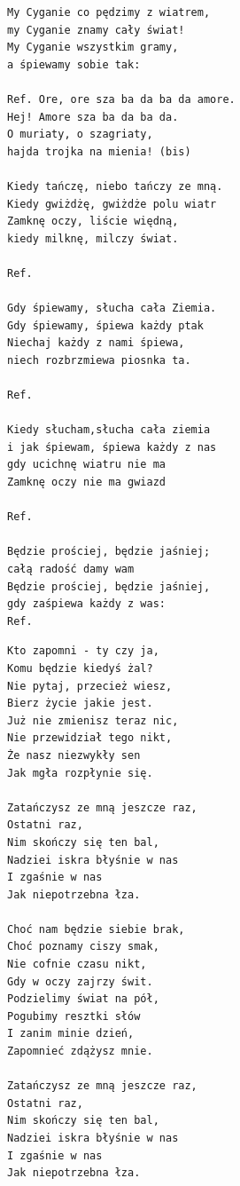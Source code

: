 \documentclass[12pt]{article}
\begin{document}
\begin{verbatim}
My Cyganie co pędzimy z wiatrem,
my Cyganie znamy cały świat!
My Cyganie wszystkim gramy,
a śpiewamy sobie tak:

Ref. Ore, ore sza ba da ba da amore.
Hej! Amore sza ba da ba da.
O muriaty, o szagriaty,
hajda trojka na mienia! (bis)

Kiedy tańczę, niebo tańczy ze mną.
Kiedy gwiżdżę, gwiżdże polu wiatr
Zamknę oczy, liście więdną,
kiedy milknę, milczy świat.

Ref.

Gdy śpiewamy, słucha cała Ziemia.
Gdy śpiewamy, śpiewa każdy ptak
Niechaj każdy z nami śpiewa,
niech rozbrzmiewa piosnka ta.

Ref.

Kiedy słucham,słucha cała ziemia
i jak śpiewam, śpiewa każdy z nas
gdy ucichnę wiatru nie ma
Zamknę oczy nie ma gwiazd

Ref.

Będzie prościej, będzie jaśniej;
całą radość damy wam
Będzie prościej, będzie jaśniej,
gdy zaśpiewa każdy z was:
Ref.
\end{verbatim}
\clearpage

\begin{verbatim}
Kto zapomni - ty czy ja,
Komu będzie kiedyś żal?
Nie pytaj, przecież wiesz,
Bierz życie jakie jest.
Już nie zmienisz teraz nic,
Nie przewidział tego nikt,
Że nasz niezwykły sen
Jak mgła rozpłynie się.

Zatańczysz ze mną jeszcze raz,
Ostatni raz,
Nim skończy się ten bal,
Nadziei iskra błyśnie w nas
I zgaśnie w nas
Jak niepotrzebna łza.

Choć nam będzie siebie brak,
Choć poznamy ciszy smak,
Nie cofnie czasu nikt,
Gdy w oczy zajrzy świt.
Podzielimy świat na pół,
Pogubimy resztki słów
I zanim minie dzień,
Zapomnieć zdążysz mnie.

Zatańczysz ze mną jeszcze raz,
Ostatni raz,
Nim skończy się ten bal,
Nadziei iskra błyśnie w nas
I zgaśnie w nas
Jak niepotrzebna łza.
\end{verbatim}
\clearpage
\end{document}
